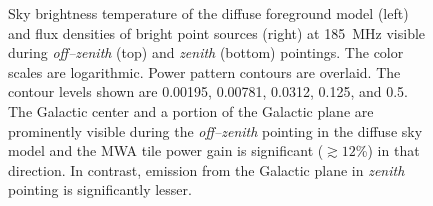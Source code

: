 \documentclass[preprint2,iop,numberedappendix]{emulateapj}
\begin{document}
\begin{figure}[htb]
\centering
{}
\caption{Sky brightness temperature of the diffuse foreground model (left) and flux densities of bright point sources (right) at 185~MHz visible during {\it off--zenith} (top) and {\it zenith} (bottom) pointings. The color scales are logarithmic. Power pattern contours are overlaid. The contour levels shown are 0.00195, 0.00781, 0.0312, 0.125, and 0.5. The Galactic center and a portion of the Galactic plane are prominently visible during the {\it off--zenith} pointing in the diffuse sky model and the MWA tile power gain is significant ($\gtrsim 12$\%) in that direction. In contrast, emission from the Galactic plane in {\it zenith} pointing is significantly lesser.}
\label{fig:sky-model-MWA}
\end{figure}
\end{document}
